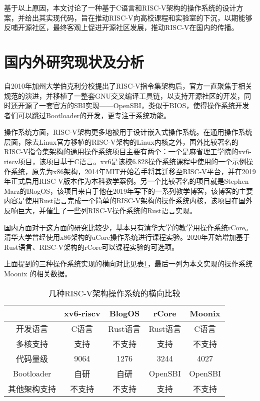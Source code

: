 基于以上原因，本文讨论了一种基于C语言和RISC-V架构的操作系统的设计方案，并给出其实现代码，旨在推动RISC-V向高校课程和实验室的下沉，以期能够反哺开源社区，最终客观上促进开源社区发展，推动RISC-V在国内的传播。

\section{国内外研究现状及分析}

自2010年加州大学伯克利分校提出了RISC-V指令集架构后，官方一直聚焦于相关规范的演进，并移植了一整套GNU交叉编译工具链，以支持开源社区的开发，同时还开源了一套官方的SBI实现——OpenSBI，类似于BIOS，使得操作系统开发者们可以跳过Bootloader的开发，更专注于系统功能。

操作系统方面，RISC-V架构更多地被用于设计嵌入式操作系统\cite{6481909}\cite{7496153}。在通用操作系统层面，除去Linux官方移植的RISC-V架构的Linux内核之外\cite{8965559}，国外比较著名的RISC-V指令集架构的通用操作系统项目主要有两个：一个是麻省理工学院的xv6-riscv项目，该项目基于C语言。xv6是该校6.828操作系统课程中使用的一个示例操作系统，原先为x86架构，2014年MIT开始着手将其迁移至RISC-V平台，并在2019年正式启用RISC-V版本作为本科教学案例。另一个比较著名的项目就是Stephen Marz的BlogOS，该项目来自于他在2019年写下的一系列教学博客，该博客的主要内容是使用Rust语言完成一个简单的RISC-V架构的操作系统内核，该项目在国外反响巨大，并催生了一些列RISC-V操作系统的Rust语言实现。

国内方面对于这方面的研究比较少，基本只有清华大学的教学用操作系统rCore。清华大学曾经使用x86架构的uCore操作系统进行课程实验。2020年开始增加基于Rust语言、RISC-V架构的rCore可以课程实验的可选项。

上面提到的三种操作系统实现的横向对比见表\ref{tab:os-compare}，最后一列为本文实现的操作系统 Moonix 的相关数据。

\begin{table}[h]
	\centering
	\setlength{\belowcaptionskip}{2pt}
	\caption{几种RISC-V架构操作系统的横向比较}
	\label{tab:os-compare}
	\begin{tabular}{|c|c|c|c|c|}
		\hline
		& xv6-riscv & BlogOS & rCore & Moonix   \\ \hline
		开发语言       & C语言       & Rust语言 & Rust语言 & C语言  \\ \hline
		多核支持       & 支持        & 不支持    & 支持   & 不支持  \\ \hline
		代码量级       & 9064      & 1276   & 3244   & 4027  \\ \hline
		Bootloader & 自研        & 自研     & OpenSBI  & OpenSBI \\ \hline
		其他架构支持     & 不支持       & 不支持    & 支持    & 不支持   \\ \hline
	\end{tabular}
\end{table}

